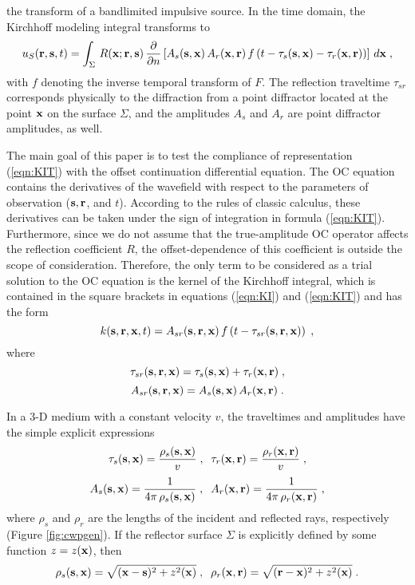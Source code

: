 the transform of a bandlimited impulsive source.  
In the time domain,
the Kirchhoff modeling integral transforms to
\begin{equation}
u_S({\bf r,s},t) = 
\int_\Sigma\,R ({\bf x;r,s})\,{\partial \over {\partial n}}
\left[A_s({\bf s,x})\,A_r({\bf x,r})\,
f\left(t- \tau_s({\bf s,x}) - \tau_r({\bf x,r})\right)\right]\,
d{\bf x}\;,
\label{eqn:KIT}
\end{equation} 
with $f$ denoting the inverse temporal transform of $F$.  The
reflection traveltime $\tau_{sr}$ corresponds physically to the
diffraction from a point diffractor located at the point ${\bf x}$ on
the surface $\Sigma$, and the amplitudes $A_s$ and $A_r$ are point
diffractor amplitudes, as well.
\par
The main goal of this paper is to test the compliance of
representation (\ref{eqn:KIT}) with the offset continuation differential
equation.  The OC equation contains the derivatives of the wavefield
with respect to the parameters of observation (${\bf s, r}$, and
$t$). According to the rules of classic calculus, these derivatives
can be taken under the sign of integration in formula
(\ref{eqn:KIT}). Furthermore, since we do not assume that the true-amplitude
OC operator affects the reflection coefficient $R $, the
offset-dependence of this coefficient is outside the scope of
consideration. Therefore, the only term to be considered as a trial
solution to the OC equation is the kernel of the Kirchhoff integral,
which is contained in the square brackets in equations (\ref{eqn:KI}) and
(\ref{eqn:KIT}) and has the form
\begin{equation}
k({\bf s,r,x},t) = A_{sr}({\bf s,r,x})\,
f\left(t - \tau_{sr}({\bf s,r,x})\right)\;,
\label{eqn:kernel}
\end{equation}
where
\begin{equation}
\tau_{sr}({\bf s,r,x}) =  \tau_s({\bf s,x}) + \tau_r({\bf x,r})\;,
\label{eqn:time}
\end{equation} 
\begin{equation}
A_{sr}({\bf s,r,x}) =  A_s({\bf s,x})\,A_r({\bf x,r})\;.
\label{eqn:amplitude}
\end{equation}
\par
In a 3-D medium with a constant velocity $v$, the traveltimes and
amplitudes have the simple explicit expressions
\begin{equation}
\tau_s({\bf s,x}) = {{\rho_s({\bf s,x})} \over v}\;,\;\;
\tau_r({\bf x,r}) = {{\rho_r({\bf x,r})} \over v}\;,
\label{eqn:taur}
\end{equation}
\begin{equation}
A_s({\bf s,x}) = {1 \over {4 \pi\,\rho_s({\bf s,x})}}\;,\;\;
A_r({\bf x,r}) = {1 \over {4 \pi\,\rho_r({\bf x,r})}}\;,
\label{eqn:ampr}
\end{equation}
where $\rho_s$ and $\rho_r$ are the lengths of the incident and reflected
rays, respectively (Figure \ref{fig:cwpgen}). If the reflector surface
$\Sigma$ is explicitly defined by some function $z=z({\bf x})$, then
\begin{equation}
\rho_s({\bf s,x}) = \sqrt{({\bf x-s})^2 + z^2({\bf x})}\;,\;\; 
\rho_r({\bf x,r}) = \sqrt{({\bf r-x})^2 + z^2({\bf x})}\;.
\label{eqn:lr}
\end{equation}

